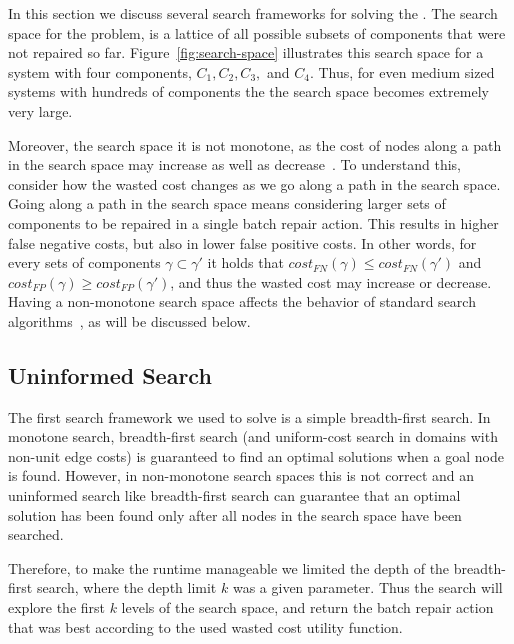 \documentclass[review]{elsarticle}
\begin{document}
In this section we discuss several search frameworks for solving the \brps{}. 
The search space for the \brps{} problem, is a lattice of all possible subsets of components that were not repaired so far. 
Figure~\ref{fig:search-space} illustrates this search space for a system with four components, $C_1, C_2, C_3,$ and $C_4$. 
Thus, for even medium sized systems with hundreds of components the the search space becomes extremely very large. 


Moreover, the \brps{} search space it is not monotone, as the cost of nodes along a path in the search space may increase as well as decrease~\cite{stern2014max}. 
To understand this, consider how the wasted cost changes as we go along a path in the search space. 
Going along a path in the search space means considering larger sets of components to be repaired in a single batch repair action. 
This results in higher false negative costs, but also in lower false positive costs. 
In other words, for every sets of components $\gamma \subset \gamma'$
it holds that $cost_{FN}(\gamma)\leq cost_{FN}(\gamma')$ 
and $cost_{FP}(\gamma)\geq cost_{FP}(\gamma')$, and thus the wasted cost may increase or decrease. 
Having a non-monotone search space affects the behavior of standard search algorithms~\cite{stern2014max}, as will be discussed below. 


\subsection{Uninformed Search}
The first search framework we used to solve \brps{} is a simple breadth-first search. 
In monotone search, breadth-first search (and uniform-cost search in domains with non-unit edge costs) 
is guaranteed to find an optimal solutions when a goal node is found. However, in non-monotone search spaces this is not correct and an uninformed search like breadth-first search 
can guarantee that an optimal solution has been found only after all nodes in the search space have been searched. 

Therefore, to make the runtime manageable we limited the depth of the breadth-first search, where the depth limit $k$ was a given parameter. 
Thus the search will explore the first $k$ levels of the search space, and return the batch repair action that was best according to the used wasted cost utility function. 
\end{document}
